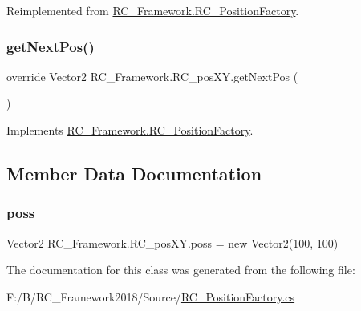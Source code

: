 Reimplemented from \mbox{\hyperlink{class_r_c___framework_1_1_r_c___position_factory_a39eaa0f4f1dfd07225b4880d494d81fa}{R\+C\+\_\+\+Framework.\+R\+C\+\_\+\+Position\+Factory}}.

\mbox{\label{class_r_c___framework_1_1_r_c__pos_x_y_a773d0a5b2b6bfc49510dbecdfbf1f9cc}} 
\subsubsection{\texorpdfstring{get\+Next\+Pos()}{getNextPos()}}
{\footnotesize\ttfamily override Vector2 R\+C\+\_\+\+Framework.\+R\+C\+\_\+pos\+X\+Y.\+get\+Next\+Pos (\begin{DoxyParamCaption}{ }\end{DoxyParamCaption})\hspace{0.3cm}{\ttfamily [virtual]}}



Implements \mbox{\hyperlink{class_r_c___framework_1_1_r_c___position_factory_aab6cd4cb6a10c8dfa126c4930c6a9fbf}{R\+C\+\_\+\+Framework.\+R\+C\+\_\+\+Position\+Factory}}.



\subsection{Member Data Documentation}
\mbox{\label{class_r_c___framework_1_1_r_c__pos_x_y_a4774a0f0a72a2c7bc38431e95df70b98}} 
\subsubsection{\texorpdfstring{poss}{poss}}
{\footnotesize\ttfamily Vector2 R\+C\+\_\+\+Framework.\+R\+C\+\_\+pos\+X\+Y.\+poss = new Vector2(100, 100)}



The documentation for this class was generated from the following file\+:\begin{DoxyCompactItemize}
\item 
F\+:/\+B/\+R\+C\+\_\+\+Framework2018/\+Source/\mbox{\hyperlink{_r_c___position_factory_8cs}{R\+C\+\_\+\+Position\+Factory.\+cs}}\end{DoxyCompactItemize}

